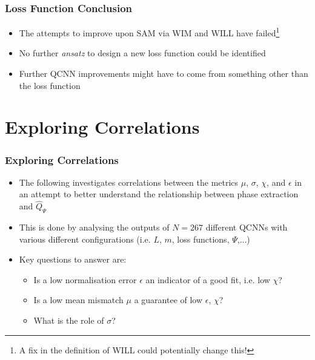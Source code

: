 \documentclass{beamer}
\begin{document}
\begin{frame}
\frametitle{Loss Function Conclusion}
\begin{itemize}
\item The attempts to improve upon SAM via \alert{WIM and WILL have failed}\footnote{A fix in the definition of WILL could potentially change this!} 
\item No further \emph{ansatz} to design a new loss function could be identified
\item Further \alert{QCNN improvements} might have to come from something \alert{other than the loss function} 
\end{itemize}
\end{frame}

\section{Exploring Correlations}

\begin{frame}
\frametitle{Exploring Correlations}
\begin{itemize}
\item The following investigates \alert{correlations between the metrics} $\mu$, $\sigma$, $\chi$, and $\epsilon$ in an attempt to better understand the relationship between phase extraction and $\hat{Q}_\Psi$
\item This is done by analysing the outputs of $N=267$ different QCNNs with \alert{various different configurations} (i.e. $L$, $m$, loss functions, $\Psi$,...)
\item Key questions to answer are:
\begin{itemize}
\item Is a low normalisation error $\epsilon$ an indicator of a good fit, i.e. low $\chi$?
\item Is a low mean mismatch $\mu$ a guarantee of low $\epsilon$, $\chi$? 
\item What is the role of $\sigma$?
\end{itemize}
\end{itemize}
\end{frame}
\end{document}
